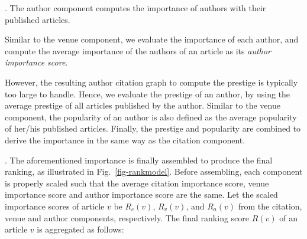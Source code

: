 .
The author component computes the importance of authors with their published articles.

Similar to the venue component, we evaluate the importance of each author, and compute the average importance of the authors of an article as its {\em author importance score}.

However, the resulting author citation graph to compute the prestige is typically too large to handle. Hence, we evaluate the prestige of an author, by using the average prestige of all articles published by the author. Similar to the venue component, the popularity of an author is also defined as the average popularity of her/his published articles. Finally, the prestige and popularity are combined to derive the importance in the same way as the citation component.







. The aforementioned importance is finally assembled to produce the final ranking, as illustrated in Fig.~\ref{fig-rankmodel}. Before assembling, each component is properly scaled such that the average citation importance score, venue importance score and author importance score
are the same.  Let the scaled importance scores of article $v$ be $R_c(v)$, $R_v(v)$, and $R_a(v)$ from the citation, venue and author components, respectively. The final ranking score $R(v)$ of an article $v$ is aggregated as follows:

